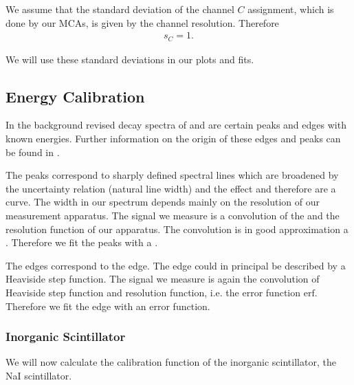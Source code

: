 We assume that the standard deviation of the channel $C$ assignment, which
is done by our MCAs, is given by the channel resolution. Therefore 
\begin{align}
  s_C = 1. \label{eq:stddevChannel}
\end{align}

We will use these standard deviations in our plots and fits.


\subsection{Energy Calibration}
\label{sss:calib}
In the background revised decay spectra of \Na and \Cs are certain peaks and
edges with known energies. Further information on the origin of these edges
and peaks can be found in \cite{fluegge}.

The peaks correspond to sharply defined spectral
lines which are broadened by the uncertainty relation (natural line width)
and the  effect and therefore are a 
curve. The width in our spectrum depends mainly on
the resolution of our measurement apparatus. The signal we measure is a
convolution of the  and the resolution function of our
apparatus. The convolution is in good approximation a .
Therefore we fit the peaks with a .

The edges correspond to the \compton edge. The edge could in principal be
described by a Heaviside step function. The signal we measure is again the
convolution of Heaviside step function and resolution function, i.e. the
error function $\mathrm{erf}$. Therefore we fit the \compton edge with an error
function.

\subsubsection{Inorganic Scintillator}
We will now calculate the calibration function of the inorganic scintillator,
the NaI scintillator.

